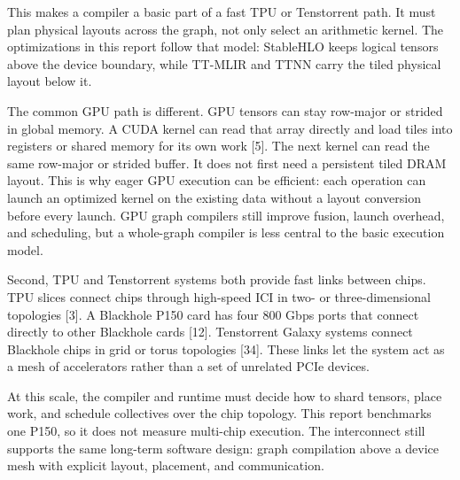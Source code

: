\documentclass[
  10pt,
  american,
  10pt,
  letterpaper]{article}
\begin{document}
This makes a compiler a basic part of a fast TPU or Tenstorrent path. It
must plan physical layouts across the graph, not only select an
arithmetic kernel. The optimizations in this report follow that model:
StableHLO keeps logical tensors above the device boundary, while TT-MLIR
and TTNN carry the tiled physical layout below it.

The common GPU path is different. GPU tensors can stay row-major or
strided in global memory. A CUDA kernel can read that array directly and
load tiles into registers or shared memory for its own work {[}5{]}. The
next kernel can read the same row-major or strided buffer. It does not
first need a persistent tiled DRAM layout. This is why eager GPU
execution can be efficient: each operation can launch an optimized
kernel on the existing data without a layout conversion before every
launch. GPU graph compilers still improve fusion, launch overhead, and
scheduling, but a whole-graph compiler is less central to the basic
execution model.

Second, TPU and Tenstorrent systems both provide fast links between
chips. TPU slices connect chips through high-speed ICI in two- or
three-dimensional topologies {[}3{]}. A Blackhole P150 card has four 800
Gbps ports that connect directly to other Blackhole cards {[}12{]}.
Tenstorrent Galaxy systems connect Blackhole chips in grid or torus
topologies {[}34{]}. These links let the system act as a mesh of
accelerators rather than a set of unrelated PCIe devices.

At this scale, the compiler and runtime must decide how to shard
tensors, place work, and schedule collectives over the chip topology.
This report benchmarks one P150, so it does not measure multi-chip
execution. The interconnect still supports the same long-term software
design: graph compilation above a device mesh with explicit layout,
placement, and communication.

\begingroup\small
\end{document}
